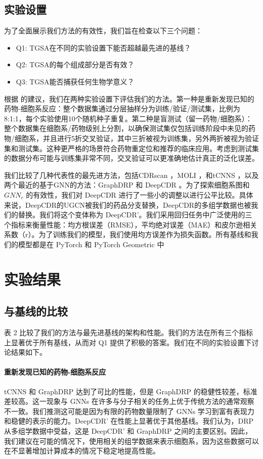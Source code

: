 \subsection{实验设置}
为了全面展示我们方法的有效性，我们旨在检查以下三个问题：
\begin{itemize}
  \item Q1: TGSA在不同的实验设置下能否超越最先进的基线？
  \item Q2: TGSA的每个组成部分是否有效？
  \item Q3: TGSA能否捕获任何生物学意义？
\end{itemize}

根据 \cite{Baptista2021} 的建议，我们在两种实验设置下评估我们的方法。第一种是重新发现已知的药物-细胞系反应：整个数据集通过分层抽样分为训练/验证/测试集，比例为8:1:1，每个实验使用10个随机种子重复。第二种是盲测试（留一药物/细胞系）：整个数据集在细胞系/药物级别上分割，以确保测试集仅包括训练阶段中未见的药物/细胞系，并且进行5折交叉验证，其中三折被视为训练集，另外两折被视为验证集和测试集。这种更严格的场景符合药物重定位和推荐的临床应用。考虑到测试集的数据分布可能与训练集非常不同，交叉验证可以更准确地估计真正的泛化误差。

我们比较了几种代表性的最先进方法，包括CDRscan \cite{Chang2018}，MOLI \cite{SharifiNoghabi2019}，和tCNNS \cite{Liu2019}，以及两个最近的基于GNN的方法：GraphDRP \cite{Nguyen2021} 和 DeepCDR \cite{Liu2020}。为了探索细胞系图和 $ GNN_c $ 的有效性，我们对 DeepCDR 进行了一些小的调整以进行公平比较。具体来说，DeepCDR的UGCN被我们的药品分支替换，DeepCDR的多组学数据也被我们的替换。我们将这个变体称为 DeepCDR'。我们采用回归任务中广泛使用的三个指标来衡量性能：均方根误差（RMSE），平均绝对误差（MAE）和皮尔逊相关系数（r）。为了训练我们的模型，我们使用均方误差作为损失函数。所有基线和我们的模型都是在 PyTorch \cite{Paszke2019} 和 PyTorch Geometric \cite{FeyandLenssen2019} 中

\section{实验结果}

\subsection{与基线的比较}
表 2 比较了我们的方法与最先进基线的架构和性能。我们的方法在所有三个指标上显著优于所有基线，从而对 Q1 提供了积极的答案。我们在不同的实验设置下讨论结果如下。

\paragraph{重新发现已知的药物-细胞系反应}
tCNNS 和 GraphDRP 达到了可比的性能，但是 GraphDRP 的稳健性较差，标准差较高。这一现象与 GNNs 在许多与分子相关的任务上优于传统方法的通常观察不一致\cite{Sun2020}。我们推测这可能是因为有限的药物数量限制了 GNNs 学习到富有表现力和稳健的表示的能力。DeepCDR' 在性能上显著优于其他基线。我们认为，DRP从多组学数据中受益，这是 DeepCDR' 和 GraphDRP 之间的主要区别。因此，我们建议在可能的情况下，使用相关的组学数据来表示细胞系，因为这些数据可以在不显著增加计算成本的情况下稳定地提高性能。

